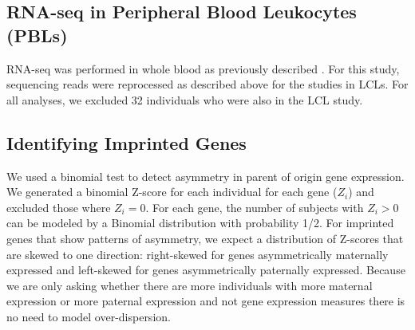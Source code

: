 \subsection{RNA-seq in Peripheral Blood Leukocytes (PBLs) }\label{RNA-seq in Peripheral Blood Leukocytes (PBLs) }
RNA-seq was performed in whole blood as previously described \citep{Stein:2016hn}. For this study, sequencing reads were reprocessed as described above for the studies in LCLs. For all analyses, we excluded 32 individuals who were also in the LCL study.

\subsection{Identifying Imprinted Genes}\label{Identifying Imprinted Genes}
We used a binomial test to detect asymmetry in parent of origin gene expression. We generated a binomial Z-score for each individual for each gene ($Z_i$) and excluded those where $Z_i =0$. For each gene, the number of subjects with $Z_i >0$ can be modeled by a Binomial distribution with probability 1/2. For imprinted genes that show patterns of asymmetry, we expect a distribution of Z-scores that are skewed to one direction: right-skewed for genes asymmetrically maternally expressed and left-skewed for genes asymmetrically paternally expressed. Because we are only asking whether there are more individuals with more maternal expression or more paternal expression and not gene expression measures there is no need to model over-dispersion.

